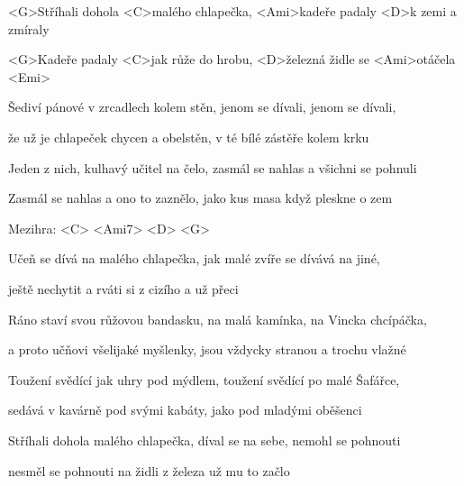 

\zs
<G>Stříhali dohola <C>malého chlapečka,
<Ami>kadeře padaly <D>k zemi a zmíraly

<G>Kadeře padaly <C>jak růže do hrobu,
<D>železná židle se <Ami>otáčela <Emi>
\ks

\zs
Šediví pánové v zrcadlech kolem stěn,
jenom se dívali, jenom se dívali,

že už je chlapeček chycen a obelstěn,
v té bílé zástěře kolem krku
\ks

\zs
Jeden z nich, kulhavý učitel na čelo,
zasmál se nahlas a všichni se pohnuli

Zasmál se nahlas a ono to zaznělo,
jako kus masa když pleskne o zem
\ks


Mezihra: <C> <Ami7> <D> <G>

\zs
Učeň se dívá na malého chlapečka,
jak malé zvíře se dívává na jiné,

ještě nechytit a rváti si z cizího
a už přeci
\ks

\zs
Ráno staví svou růžovou bandasku,
na malá kamínka, na Vincka chcípáčka,

a proto učňovi všelijaké myšlenky,
jsou vždycky stranou a trochu vlažné
\ks

\zs
Toužení svědící jak uhry pod mýdlem,
toužení svědící po malé Šafářce,

sedává v kavárně pod svými kabáty,
jako pod mladými oběšenci
\ks

\zs
Stříhali dohola malého chlapečka,
díval se na sebe, nemohl se pohnouti

nesměl se pohnouti na židli z železa
už mu to začlo
\ks

\kp
